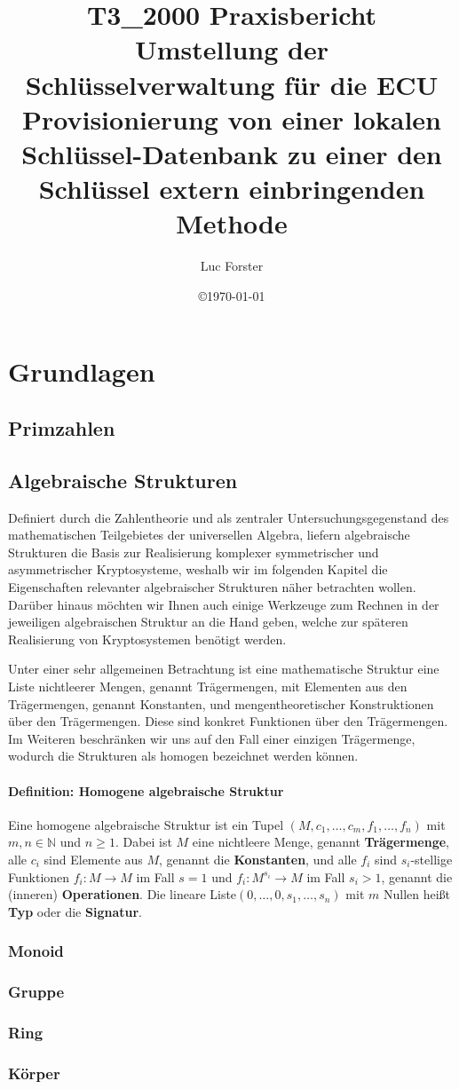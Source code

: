 \documentclass[12pt]{article}							%
\title{T3\_2000 Praxisbericht\\Umstellung der Schlüsselverwaltung für die ECU Provisionierung von einer lokalen Schlüssel-Datenbank zu einer den Schlüssel extern einbringenden Methode} 	%
\author{Luc Forster}									%
\date{\copyright\today}									%
\begin{document}
\section{Grundlagen}
\subsection{Primzahlen}
\subsection{Algebraische Strukturen}
Definiert durch die Zahlentheorie und als zentraler Untersuchungsgegenstand des mathematischen Teilgebietes der universellen Algebra, liefern algebraische Strukturen die Basis zur Realisierung komplexer symmetrischer und asymmetrischer Kryptosysteme, weshalb wir im folgenden Kapitel die Eigenschaften relevanter algebraischer Strukturen näher betrachten wollen. Darüber hinaus möchten wir Ihnen auch einige Werkzeuge zum Rechnen in der jeweiligen algebraischen Struktur an die Hand geben, welche zur späteren Realisierung von Kryptosystemen benötigt werden.

Unter einer sehr allgemeinen Betrachtung ist eine mathematische Struktur eine Liste nichtleerer Mengen, genannt Trägermengen, mit Elementen aus den Trägermengen, genannt Konstanten, und mengentheoretischer Konstruktionen über den Trägermengen. Diese sind konkret Funktionen über den Trägermengen.
Im Weiteren beschränken wir uns auf den Fall einer einzigen Trägermenge, wodurch die Strukturen als homogen bezeichnet werden können.
\paragraph{Definition: Homogene algebraische Struktur}
Eine homogene algebraische Struktur ist ein Tupel $(M,c_1,\dots,c_m,f_1,\dots,f_n)$ mit $m,n \in \mathbb{N}$ und $n \geq 1$. Dabei ist $M$ eine nichtleere Menge, genannt \textbf{Trägermenge}, alle $c_i$ sind Elemente aus $M$, genannt die \textbf{Konstanten}, und alle $f_i$ sind $s_i$-stellige Funktionen $f_i:M \rightarrow M$ im Fall $s = 1$ und $f_i:M^{s_i} \rightarrow M$ im Fall $s_i>1$, genannt die (inneren) \textbf{Operationen}. Die lineare Liste$(0,\dots,0,s_1,\dots,s_n)$ mit $m$ Nullen heißt \textbf{Typ} oder die \textbf{Signatur}.
\subsubsection{Monoid}
\subsubsection{Gruppe}
\subsubsection{Ring}
\subsubsection{Körper}
\end{document}

